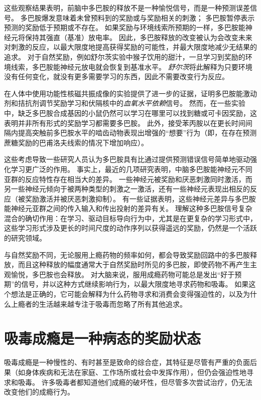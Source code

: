 这些观察结果表明，前脑中多巴胺的释放不是一种愉悦信号，而是一种预测误差信号。
多巴胺爆发意味着未曾预料到的奖励或与奖励相关的刺激；
多巴胺暂停表示预测的奖励低于预期或不存在。
如果奖励与环境线索所预期的一样，多巴胺能神经元将保持其强直（基准）放电率。
因此，多巴胺释放的改变被认为会改变未来对刺激的反应，以最大限度地提高获得奖励的可能性，并最大限度地减少无结果的追求。
对于自然奖励，例如舒尔茨实验中猴子饮用的甜汁，一旦学习到奖励的环境线索，多巴胺能神经元放电就会恢复到基准水平。
\textit{舒尔茨}将此解释为只要环境没有任何变化，就没有更多需要学习的东西，因此不需要改变行为反应。


在人体中使用功能性核磁共振成像的实验提供了进一步的证据，证明多巴胺能激动剂和拮抗剂调节奖励学习和伏隔核中的\textit{血氧水平依赖}信号。
然而，在一些实验中，缺乏多巴胺合成基因的小鼠仍然可以学习在哪里可以找到糖或可卡因奖励，这表明并非所有形式的奖励学习都需要多巴胺。
此外，接受苯丙胺以在更长时间间隔内提高突触前多巴胺水平的啮齿动物表现出增强的“想要”行为（即，在存在预测蔗糖奖励的巴甫洛夫线索的情况下增加响应）。


这些考虑导致一些研究人员认为多巴胺具有比通过提供预测错误信号简单地驱动强化学习更广泛的作用。
事实上，最近的几项研究表明，中脑多巴胺能神经元不同亚群的反应特性存在相当大的差异。
一些神经元被奖励和厌恶刺激同时激活，而另一些神经元倾向于被两种类型的刺激之一激活，还有一些神经元表现出相反的反应（被奖励激活并被厌恶刺激抑制）。
有一些证据表明，这些神经元差异与多巴胺能神经元亚群之间的传入输入和传出投射的差异有关。
理解这种多巴胺信号复杂混合的确切作用：在学习、驱动目标导向行为中，尤其是在更复杂的学习形式中，这些学习形式涉及更长的时间尺度的动作序列以获得遥远的奖励，仍然是一个活跃的研究领域。


与自然奖励不同，无论服用上瘾药物的频率如何，都会导致奖励回路中的多巴胺释放，而且这种释放的幅度通常大于自然奖励时所见的多巴胺，即使药物不再产生主观愉悦，多巴胺也会释放。
对大脑来说，服用成瘾药物可能总是发出“好于预期”的信号，并以这种方式继续影响行为，以最大限度地寻求药物和吸毒。
如果这个想法是正确的，它可能会解释为什么药物寻求和消费会变得强迫性的，以及为什么上瘾者的生活越来越专注于吸毒而忽略了所有其他追求。



\section{吸毒成瘾是一种病态的奖励状态}

吸毒成瘾是一种慢性的、有时甚至是致命的综合症，其特征是尽管有严重的负面后果（如身体疾病和无法在家庭、工作场所或社会中发挥作用），但仍会强迫性地寻求和吸毒。
许多吸毒者都知道他们成瘾的破坏性，但尽管多次尝试治疗，仍无法改变他们的成瘾行为。


